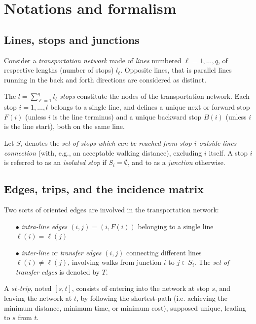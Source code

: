 \documentclass{bmcart}
\begin{document}

\section{Notations and formalism}
\label{notforma}
\subsection{Lines, stops  and junctions}
\label{Lines and junctions}
Consider a \emph{transportation network} made of \emph{lines} numbered $\ell=1,\ldots, q$, of respective lengths (number of stops) $l_\ell$.  Opposite lines, that is parallel lines running in the back and forth directions are considered as distinct. 

The $l=\sum_{\ell=1}^ql_\ell$ \emph{stops} constitute the nodes of the transportation network. Each stop $i=1,\ldots,l$ belongs to a single line, and defines a unique next or forward stop $F(i)$ (unless $i$ is the line terminus) and a unique backward stop $B(i)$ (unless $i$ is the line start), both on the same line.  

Let $S_i$ denotes the \emph{set of stops which can be reached from stop $i$ outside lines connection} (with, e.g., an acceptable walking distance), excluding $i$ itself. A stop $i$ is referred to as an \emph{isolated stop} if $S_i=\emptyset$, and to as a \emph{junction} otherwise. 

\subsection{Edges, trips, and the incidence matrix}
\label{Line edges, transfer edges and trips}

Two sorts of oriented edges are involved in the transportation network: 
\begin{enumerate}
  \item[$\bullet$] \emph{intra-line edges} $(i,j)=(i,F(i))$ belonging to a single line  $\ell(i)=\ell(j)$
  \item[$\bullet$] \emph{inter-line} or \emph{transfer edges} $(i,j)$ connecting different lines $\ell(i)\neq \ell(j)$, involving walks from junction $i$ to $j\in S_i$. The \emph{set of transfer edges} is denoted by $T$.
\end{enumerate}

A \emph{$st$-trip}, noted $[s,t]$, consists of entering into the network at stop $s$, and leaving the network at $t$, by following the shortest-path (i.e. achieving the minimum distance,  minimum time, or  minimum cost), supposed unique, leading to $s$ from $t$.
\end{document}
